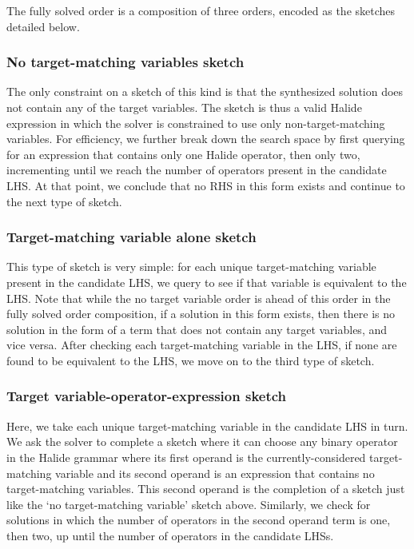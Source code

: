 The fully solved order is a composition of three orders, encoded as the sketches detailed below.

\subsubsection{No target-matching variables sketch}
The only constraint on a sketch of this kind is that the synthesized solution does not contain any of the target variables. The sketch is thus a valid Halide expression in which the solver is constrained to use only non-target-matching variables. For efficiency, we further break down the search space by first querying for an expression that contains only one Halide operator, then only two, incrementing until we reach the number of operators present in the candidate LHS. At that point, we conclude that no RHS in this form exists and continue to the next type of sketch.

\subsubsection{Target-matching variable alone sketch}

This type of sketch is very simple: for each unique target-matching variable present in the candidate LHS, we query to see if that variable is equivalent to the LHS. Note that while the no target variable order is ahead of this order in the fully solved order composition, if a solution in this form exists, then there is no solution in the form of a term that does not contain any target variables, and vice versa. After checking each target-matching variable in the LHS, if none are found to be equivalent to the LHS, we move on to the third type of sketch.

\subsubsection{Target variable-operator-expression sketch}
Here, we take each unique target-matching variable in the candidate LHS in turn. We ask the solver to complete a sketch where it can choose any binary operator in the Halide grammar where its first operand is the currently-considered target-matching variable and its second operand is an expression that contains no target-matching variables. This second operand is the completion of a sketch just like the `no target-matching variable' sketch above. Similarly, we check for solutions in which the number of operators in the second operand term is one, then two, up until the number of operators in the candidate LHSs.

